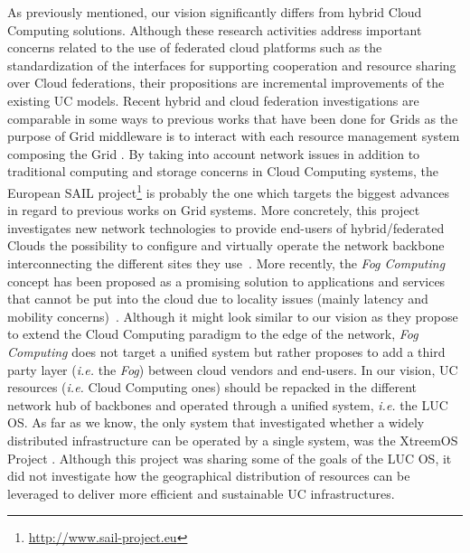 As previously mentioned, our vision significantly differs from hybrid Cloud Computing
solutions.  Although these research activities address important concerns related to the
use of federated cloud platforms such as the standardization of the interfaces for
supporting cooperation and resource sharing over Cloud federations, their propositions are
incremental improvements of the existing UC models. Recent hybrid and
cloud federation investigations are comparable in some ways to previous works that have
been done for Grids as the purpose of Grid middleware is to interact with each
resource management system composing the Grid
\cite{buyya:2010,rochwerger:2009,zhao:2012}. By taking into account network issues in
addition to traditional computing and storage concerns in Cloud Computing systems, the
European SAIL
project\footnote{\href{http://www.sail-project.eu}{\url{http://www.sail-project.eu}}} is
probably the one which targets the biggest advances in regard to previous works on
Grid systems. More concretely, this project investigates new network
technologies to
provide end-users of hybrid/federated Clouds the possibility to configure and
virtually operate the network backbone interconnecting the different sites they
use~\cite{sail:2012}.
%
More recently, the \emph{Fog Computing} concept has been proposed
as a promising solution to applications and services that
cannot be put into the cloud due to locality issues (mainly latency and
mobility concerns)~\cite{bonomi:2012}.  Although it might look similar to our vision as they
propose to extend the Cloud Computing paradigm to the edge of the network,
\emph{Fog Computing} does not target a unified system but rather proposes to
add a third party layer (\textit{i.e.} the \emph{Fog}) between cloud vendors and
end-users.
%
In our vision, UC resources (\textit{i.e.} Cloud Computing ones) should be repacked in
the different network hub of backbones and operated through a unified system, \textit{i.e.} the LUC OS.
%
As far as we know, the only system that investigated whether a
widely distributed infrastructure can be operated by a single system, was the
XtreemOS Project \cite{morin:2007}. Although this project was sharing some of
the goals of the LUC OS, it did not investigate how the geographical
distribution of resources can be leveraged to deliver more efficient and sustainable
UC infrastructures. 
%

